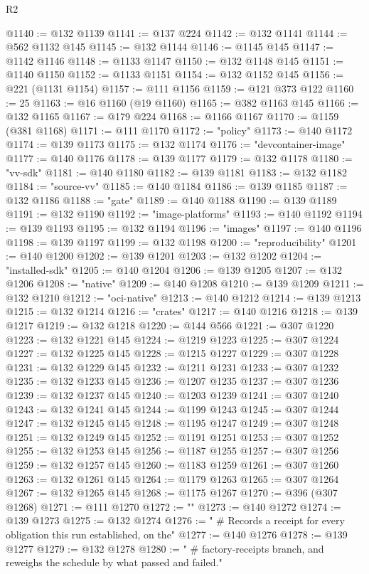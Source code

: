 \begin{lexlean}{R2}
\begin{coremodule}
@1140 := @132 @1139
@1141 := @137 @224
@1142 := @132 @1141
@1144 := @562 @1132 @145
@1145 := @132 @1144
@1146 := @1145 @145
@1147 := @1142 @1146
@1148 := @1133 @1147
@1150 := @132 @1148 @145
@1151 := @1140 @1150
@1152 := @1133 @1151
@1154 := @132 @1152 @145
@1156 := @221 (@1131 @1154)
@1157 := @111 @1156
@1159 := @121 @373 @122
@1160 := 25
@1163 := @16 @1160 (@19 @1160)
@1165 := @382 @1163 @145
@1166 := @132 @1165
@1167 := @179 @224
@1168 := @1166 @1167
@1170 := @1159 (@381 @1168)
@1171 := @111 @1170
@1172 := "policy"
@1173 := @140 @1172
@1174 := @139 @1173
@1175 := @132 @1174
@1176 := "devcontainer-image"
@1177 := @140 @1176
@1178 := @139 @1177
@1179 := @132 @1178
@1180 := "vv-sdk"
@1181 := @140 @1180
@1182 := @139 @1181
@1183 := @132 @1182
@1184 := "source-vv"
@1185 := @140 @1184
@1186 := @139 @1185
@1187 := @132 @1186
@1188 := "gate"
@1189 := @140 @1188
@1190 := @139 @1189
@1191 := @132 @1190
@1192 := "image-platforms"
@1193 := @140 @1192
@1194 := @139 @1193
@1195 := @132 @1194
@1196 := "images"
@1197 := @140 @1196
@1198 := @139 @1197
@1199 := @132 @1198
@1200 := "reproducibility"
@1201 := @140 @1200
@1202 := @139 @1201
@1203 := @132 @1202
@1204 := "installed-sdk"
@1205 := @140 @1204
@1206 := @139 @1205
@1207 := @132 @1206
@1208 := "native"
@1209 := @140 @1208
@1210 := @139 @1209
@1211 := @132 @1210
@1212 := "oci-native"
@1213 := @140 @1212
@1214 := @139 @1213
@1215 := @132 @1214
@1216 := "crates"
@1217 := @140 @1216
@1218 := @139 @1217
@1219 := @132 @1218
@1220 := @144 @566
@1221 := @307 @1220
@1223 := @132 @1221 @145
@1224 := @1219 @1223
@1225 := @307 @1224
@1227 := @132 @1225 @145
@1228 := @1215 @1227
@1229 := @307 @1228
@1231 := @132 @1229 @145
@1232 := @1211 @1231
@1233 := @307 @1232
@1235 := @132 @1233 @145
@1236 := @1207 @1235
@1237 := @307 @1236
@1239 := @132 @1237 @145
@1240 := @1203 @1239
@1241 := @307 @1240
@1243 := @132 @1241 @145
@1244 := @1199 @1243
@1245 := @307 @1244
@1247 := @132 @1245 @145
@1248 := @1195 @1247
@1249 := @307 @1248
@1251 := @132 @1249 @145
@1252 := @1191 @1251
@1253 := @307 @1252
@1255 := @132 @1253 @145
@1256 := @1187 @1255
@1257 := @307 @1256
@1259 := @132 @1257 @145
@1260 := @1183 @1259
@1261 := @307 @1260
@1263 := @132 @1261 @145
@1264 := @1179 @1263
@1265 := @307 @1264
@1267 := @132 @1265 @145
@1268 := @1175 @1267
@1270 := @396 (@307 @1268)
@1271 := @111 @1270
@1272 := ""
@1273 := @140 @1272
@1274 := @139 @1273
@1275 := @132 @1274
@1276 := "  # Records a receipt for every obligation this run established, on the"
@1277 := @140 @1276
@1278 := @139 @1277
@1279 := @132 @1278
@1280 := "  # factory-receipts branch, and reweighs the schedule by what passed and failed."

\end{coremodule}
\end{lexlean}
